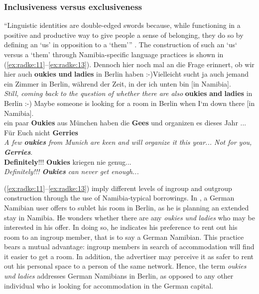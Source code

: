 \documentclass[output=paper]{langsci/langscibook}
\begin{document}
 
  \subsubsection{Inclusiveness versus exclusiveness}
 \label{sec:radke:3.4.2}

“Linguistic identities are double-edged swords because, while functioning in a positive and productive way to give people a sense of belonging, they do so by defining an ‘us’ in opposition to a ‘them’” \citep[261]{joseph_linguistic_2006}. The construction of such an ‘us‘ versus a ‘them’ through Namibia-specific language practices is shown in (\ref{ex:radke:11}--\ref{ex:radke:13}).
\ea
\label{ex:radke:11}
Dennoch hier noch mal an die Frage erinnert, ob wir hier auch \textbf{oukies} \textbf{und} \textbf{ladies} in Berlin haben :-)Vielleicht sucht ja auch jemand ein Zimmer in Berlin, während der Zeit, in der ich unten bin [in Namibia].\\
\textit{Still, coming back to the question of whether there are also} \textbf{oukies} \textbf{and} \textbf{ladies} in Berlin :-) Maybe someone is looking for a room in Berlin when I‘m down there [in Namibia].\\
\ex\label{ex:radke:12}
ein paar \textbf{Oukies} aus München haben die \textbf{Gees} und organizen es dieses Jahr ... Für Euch nicht \textbf{Gerries}\\
\textit{A few \textbf{oukies} from Munich are keen and will organize it this year... Not for you, \textbf{Gerries}}.\\
\ex\label{ex:radke:13}
 \textbf{Definitely}!!! \textbf{Oukies} kriegen nie genug...\\
\textit{{Definitely!!!} \textbf{{Oukies}} {can never get enough...}}\\
\z

(\ref{ex:radke:11}--\ref{ex:radke:13}) imply different levels of ingroup and outgroup construction through the use of Namibia-typical borrowings. In , a German Namibian user offers to sublet his room in Berlin, as he is planning an extended stay in Namibia. He wonders whether there are any \textit{oukies} \textit{und} \textit{ladies} who may be interested in his offer. In doing so, he indicates his preference to rent out his room to an ingroup member, that is to say a German Namibian. This practice bears a mutual advantage:  ingroup members in search of accommodation will find it easier to get a room. In addition, the advertiser may perceive it as safer to rent out his personal space to a person of the same network. Hence, the term \textit{oukies} \textit{und} \textit{ladies} addresses German Namibians in Berlin, as opposed to any other individual who is looking for accommodation in the German capital.  
\end{document}
